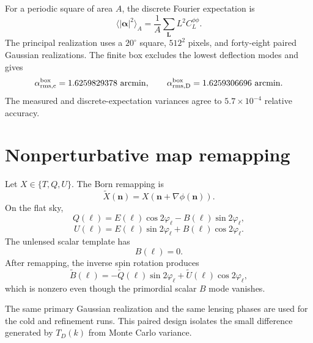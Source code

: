 For a periodic square of area $A$, the discrete Fourier expectation is
\begin{equation}
 \boxed{
 \langle |\boldsymbol\alpha|^2\rangle_A
 =\frac{1}{A}\sum_{\boldsymbol L}
 L^2C_L^{\phi\phi}.
 }
 \label{eq:lens-alpha-box}
\end{equation}
The principal realization uses a $20^\circ$ square, $512^2$ pixels, and forty-eight paired Gaussian realizations.  The finite box excludes the lowest deflection modes and gives
\begin{equation}
 \alpha_{\rm rms,c}^{\rm box}=1.6259829378\ {\mathrm{arcmin}},
 \qquad
 \alpha_{\rm rms,D}^{\rm box}=1.6259306696\ {\mathrm{arcmin}}.
 \label{eq:lens-alpha-box-values}
\end{equation}
The measured and discrete-expectation variances agree to $5.7\times10^{-4}$ relative accuracy.

\section{Nonperturbative map remapping}

Let $X\in\{T,Q,U\}$.  The Born remapping is
\begin{equation}
 \widetilde X(\boldsymbol n)
 =X\!\left(\boldsymbol n+\nabla\phi(\boldsymbol n)\right).
 \label{eq:lens-remap}
\end{equation}
On the flat sky,
\begin{equation}
 Q(\boldsymbol\ell)
 =E(\boldsymbol\ell)\cos2\varphi_\ell
 -B(\boldsymbol\ell)\sin2\varphi_\ell,
 \label{eq:lens-q-eb}
\end{equation}
\begin{equation}
 U(\boldsymbol\ell)
 =E(\boldsymbol\ell)\sin2\varphi_\ell
 +B(\boldsymbol\ell)\cos2\varphi_\ell.
 \label{eq:lens-u-eb}
\end{equation}
The unlensed scalar template has
\begin{equation}
 B(\boldsymbol\ell)=0.
 \label{eq:lens-unlensed-b-zero}
\end{equation}
After remapping, the inverse spin rotation produces
\begin{equation}
 \widetilde B(\boldsymbol\ell)
 =-\widetilde Q(\boldsymbol\ell)\sin2\varphi_\ell
 +\widetilde U(\boldsymbol\ell)\cos2\varphi_\ell,
 \label{eq:lens-generated-b}
\end{equation}
which is nonzero even though the primordial scalar $B$ mode vanishes.

The same primary Gaussian realization and the same lensing phases are used for the cold and refinement runs.  This paired design isolates the small difference generated by $T_D(k)$ from Monte Carlo variance.

